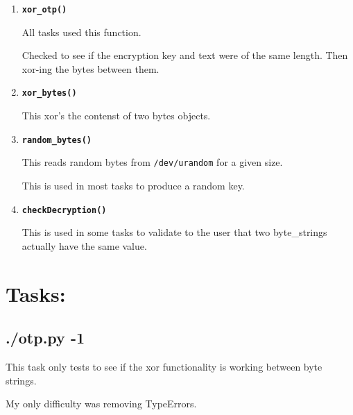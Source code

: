 \documentclass[12pt]{exam}
\begin{document}
\begin{enumerate}[\bf 1)]
    \item \textbf{\texttt{xor\_otp()}}

    All tasks used this function.

    Checked to see if the encryption key and text were of the same length.
    Then xor-ing the bytes between them.

    \bigskip
    
    \bigskip

    \item \textbf{\texttt{xor\_bytes()}}

    This xor's the contenst of two bytes objects.

    \bigskip
    
    \bigskip

    \item \textbf{\texttt{random\_bytes()}}

    This reads random bytes from \texttt{/dev/urandom} for a given size.

    This is used in most tasks to produce a random key.

    \bigskip
    
    \bigskip

    \item \textbf{\texttt{checkDecryption()}}

    This is used in some tasks to validate to the user that two byte\_strings
    actually have the same value.

    \bigskip
    
    \bigskip

\end{enumerate}


\section*{Tasks:}

\subsection{./otp.py -1}

    \bigskip
This task only tests to see if the xor functionality is 
working between byte strings. 

My only difficulty was removing TypeErrors.

    \bigskip
    \bigskip
    
    \bigskip
\end{document}
